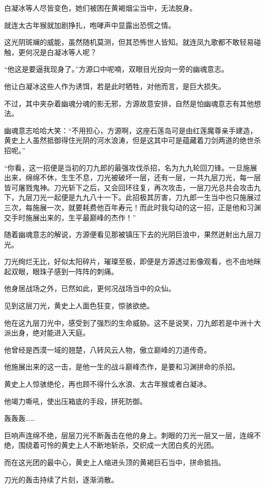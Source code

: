 \begin{this_body}
白凝冰等人尽皆变色，她们被困在黄褐烟尘当中，无法脱身。

就连太古年猴就加剧挣扎，咆哮声中显露出恐慌之情。

这光阴斑斓的威能，虽然随机莫测，但其恐怖世人皆知。就连凤九歌都不敢轻易碰触，更何况是白凝冰等人呢？

“他这是要逼我现身了。”方源口中呢喃，双眼目光投向一旁的幽魂意志。

他让白凝冰这些人作为诱饵，若是此时牺牲，对他而言，是巨大损失。

不过，其中夹杂着幽魂分魂的影无邪，方源故意安排，自然是怕幽魂意志有其他想法。

幽魂意志哈哈大笑：“不用担心，方源啊，这座石莲岛可是由红莲魔尊亲手建造，黄史上人虽然抵御得住光阴的河水浪涛，但是这其中可是蕴藏着刀剑两道的绝世杀招呢。”

“你看，这一招便是当初的刀九郎的最强攻伐杀招，名为九九轮回刀锋。一旦施展出来，绵绵不休，生生不息，刀光被破坏一层，还有一层，一共九层刀光，每一层皆可屠戮鬼神。刀光斩下之后，又会回环往复，再次攻击，一层刀光总共会攻击九下，九层刀光一起便是九九八十一下。此招极其厉害，刀九郎一生当中也只施展过三次，每施展一次，就要耗费他百年寿元！而此时我勾动的这一招，正是他和习渊交手时施展出来的，生平最巅峰的杰作！”

随着幽魂意志的解说，方源便看见那被镇压下去的光阴巨浪中，果然迸射出九层刀光。

刀光绚烂无比，好似太阳碎片，璀璨至极，即便是方源透过影像观看，也不由地眯起双眼，眼珠子感到一阵阵的刺痛。

他身居战场之外，已然如此，更何况战场当中的众仙。

见到这层刀光，黄史上人面色狂变，惊骇欲绝。

他在这九层刀光中，感受到了强烈的生命威胁。这不是说笑，刀九郎若是中洲十大派出身，绝对能进入天庭。

他曾经是西漠一域的翘楚，八转风云人物，傲立巅峰的刀道传奇。

他施展出来的这一击，是他一生的战斗巅峰杰作，是要和习渊拼命的杀招。

黄史上人惊骇绝伦，再也顾不得什么水浪、太古年猴或者白凝冰。

他竭力嘶吼，使出压箱底的手段，拼死防御。

轰轰轰……

巨响声连绵不绝，层层刀光不断轰击在他的身上。刺眼的刀光一层又一层，连绵不绝，围绕着可怜的黄史上人不断地斩杀，交织成一大团白炙的光团。

而在这光团的最中心，黄史上人缩进头顶的黄褐巨石当中，拼命抵挡。

刀光的轰击持续了片刻，逐渐消散。


\end{this_body}
